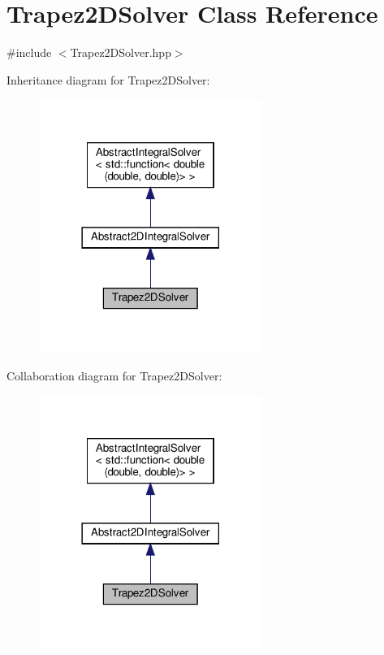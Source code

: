 \hypertarget{class_trapez2_d_solver}{}\section{Trapez2\+D\+Solver Class Reference}
\label{class_trapez2_d_solver}


{\ttfamily \#include $<$Trapez2\+D\+Solver.\+hpp$>$}



Inheritance diagram for Trapez2\+D\+Solver\+:\nopagebreak
\begin{figure}[H]
\begin{center}
\leavevmode
\includegraphics[width=206pt]{class_trapez2_d_solver__inherit__graph}
\end{center}
\end{figure}


Collaboration diagram for Trapez2\+D\+Solver\+:\nopagebreak
\begin{figure}[H]
\begin{center}
\leavevmode
\includegraphics[width=206pt]{class_trapez2_d_solver__coll__graph}
\end{center}
\end{figure}
